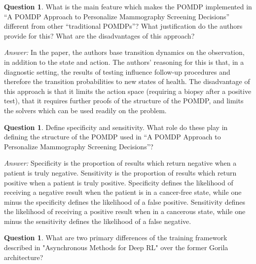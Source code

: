 \documentclass{article}
\theoremstyle{definition}
\newtheorem{question}[thm]{Question}
\newenvironment{answer}{\noindent\textit{Answer:}}{}
\begin{document}
\begin{question}
What is the main feature which makes the POMDP implemented in “A POMDP Approach to Personalize Mammography Screening Decisions” different from other “traditional POMDPs”? What justification do the authors provide for this? What are the disadvantages of this approach?
\end{question}

\begin{answer}
In the paper, the authors base transition dynamics on the observation, in addition to the state and action. The authors’ reasoning for this is that, in a diagnostic setting, the results of testing influence follow-up procedures and therefore the transition probabilities to new states of health. The disadvantage of this approach is that it limits the action space (requiring a biopsy after a positive test), that it requires further proofs of the structure of the POMDP, and limits the solvers which can be used readily on the problem.
\end{answer}

\begin{question}
Define specificity and sensitivity. What role do these play in defining the structure of the POMDP used in “A POMDP Approach to Personalize Mammography Screening Decisions”?
\end{question}

\begin{answer}
Specificity is the proportion of results which return negative when a patient is truly negative. Sensitivity is the proportion of results which return positive when a patient is truly positive. Specificity defines the likelihood of receiving a negative result when the patient is in a cancer-free state, while one minus the specificity defines the likelihood of a false positive. Sensitivity defines the likelihood of receiving a positive result when in a cancerous state, while one minus the sensitivity defines the likelihood of a false negative.
\end{answer}

\begin{question}
What are two primary differences of the training framework described in "Asynchronous Methods for Deep RL" over the former Gorila architecture?
\end{question}
\end{document}
